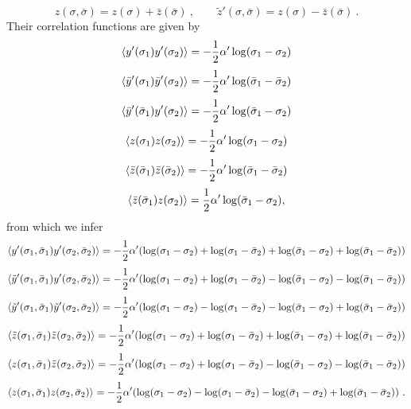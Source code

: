 \documentclass[12pt]{article}
\newcommand{\be}{\begin{equation}}
\newcommand{\ee}{\end{equation}}
\begin{document}
\be z(\sigma, \bar \sigma) = z(\sigma) + \bar z(\bar \sigma)\ , \qquad
\tilde z'(\sigma, \bar \sigma) = z(\sigma) - \bar z(\bar \sigma) \ . \ee
%
Their correlation functions are given by
%
\be \langle y'(\sigma_1) y'(\sigma_2) \rangle  = -{1 \over 2} \alpha' \log(\sigma_1 - \sigma_2) \ee
\be \langle \bar y'(\sigma_1) \bar y'(\sigma_2) \rangle
=  -{1 \over 2} \alpha'\log(\bar \sigma_1 - \bar \sigma_2) \ee
\be \langle \bar y'(\bar \sigma_1) y'(\sigma_2) \rangle =
 - {1 \over 2} \alpha'\log(\bar \sigma_1 - \sigma_2) \ee
\be \langle z(\sigma_1) z(\sigma_2) \rangle  = 
-{1 \over 2}\alpha'\log(\sigma_1 -
 \sigma_2) \ee
\be \langle \bar z (\bar \sigma_1) \bar z(\bar \sigma_2) \rangle
=  -{1 \over 2}\alpha' \log(\bar \sigma_1 - \bar \sigma_2) \ee
\be \langle \bar z(\bar \sigma_1) z(\sigma_2) \rangle =
 {1 \over 2}\alpha'\log(\bar \sigma_1 - \sigma_2), \ee
%
%
from which we infer
%
\be  \langle  y'(\sigma_1,\bar \sigma_1) y'(\sigma_2,\bar \sigma_2) \rangle=  -{1 \over 2} \alpha'(
\log(\sigma_1- \sigma_2) +
\log(\sigma_1- \bar \sigma_2) +
\log(\bar \sigma_1- \sigma_2) +
\log(\bar \sigma_1- \bar \sigma_2) ) \label{coor1}  \ee
%
\be \langle \tilde y'(\sigma_1,\bar \sigma_1) y'(\sigma_2,\bar \sigma_2) \rangle
=  - {1 \over 2} \alpha'  (
\log(\sigma_1- \sigma_2) +
\log(\sigma_1- \bar \sigma_2) -
\log(\bar \sigma_1- \sigma_2) -
\log(\bar \sigma_1- \bar \sigma_2) ) \label{coor2} \ee
%
\be  \langle \tilde y'(\sigma_1,\bar\sigma_1) \tilde y'(\sigma_2,\bar \sigma_2) \rangle
 =  - {1 \over 2}  \alpha'  (
\log(\sigma_1- \sigma_2) -
\log(\sigma_1- \bar \sigma_2) -
\log(\bar \sigma_1- \sigma_2) +
\log(\bar \sigma_1- \bar \sigma_2) ) \label{coor3} \ee
%
\be  \langle \tilde z(\sigma_1,\bar \sigma_1) \tilde z(\sigma_2,\bar \sigma_2) \rangle=  -{1 \over 2} \alpha'(
\log(\sigma_1- \sigma_2) +
\log(\sigma_1- \bar \sigma_2) +
\log(\bar \sigma_1- \sigma_2) +
\log(\bar \sigma_1- \bar \sigma_2) ) \label{coor4} \ee
%
\be \langle z(\sigma_1,\bar \sigma_1) \tilde z(\sigma_2,\bar \sigma_2) \rangle
=  - {1 \over 2} \alpha'  (
\log(\sigma_1- \sigma_2) +
\log(\sigma_1- \bar \sigma_2) -
\log(\bar \sigma_1- \sigma_2) -
\log(\bar \sigma_1- \bar \sigma_2) ) \label{coor5} \ee
%
\be  \langle z(\sigma_1,\bar\sigma_1) z(\sigma_2,\bar \sigma_2) \rangle
 =  - {1 \over 2}  \alpha'  (
\log(\sigma_1- \sigma_2) -
\log(\sigma_1- \bar \sigma_2) -
\log(\bar \sigma_1- \sigma_2) +
\log(\bar \sigma_1- \bar \sigma_2) ) \label{coor6} \ . \ee
\end{document}
